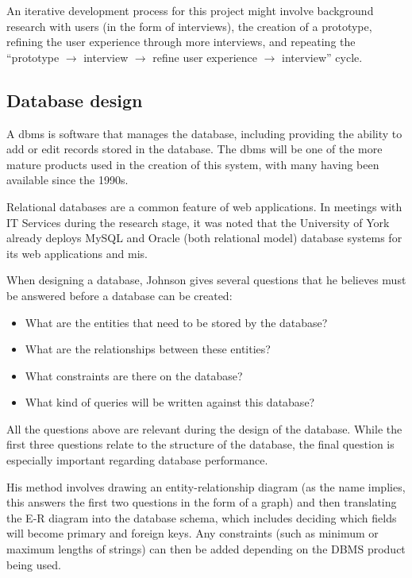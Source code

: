 \documentclass[draft]{scrartcl}
\begin{document}
An iterative development process for this project might involve background
research with users (in the form of interviews), the creation of a prototype,
refining the user experience through more interviews, and repeating the
``prototype $\rightarrow$ interview $\rightarrow$ refine user experience
$\rightarrow$ interview'' cycle.

\subsection{Database design}

A \gls{dbms} is software that manages the database, including providing the
ability to add or edit records stored in the database. The \gls{dbms} will be
one of the more mature products used in the creation of this system, with many
having been available since the 1990s.

Relational databases are a common feature of web applications. In meetings
with IT Services during the research stage, it was noted that the University
of York already deploys MySQL and Oracle (both relational model) database
systems for its web applications and \gls{mis}.

When designing a database, Johnson \cite{DatabaseModelsLanguagesDesign} gives
several questions that he believes must be answered before a database can be
created:

\begin{itemize}
  \item What are the entities that need to be stored by the database?
  \item What are the relationships between these entities?
  \item What constraints are there on the database?
  \item What kind of queries will be written against this database?
\end{itemize}

All the questions above are relevant during the design of the database. While
the first three questions relate to the structure of the database, the final
question is especially important regarding database performance.

His method involves drawing an entity-relationship diagram (as the name
implies, this answers the first two questions in the form of a graph) and then
translating the E-R diagram into the database schema, which includes deciding
which fields will become primary and foreign keys. Any constraints (such as
minimum or maximum lengths of strings) can then be added depending on the DBMS
product being used.
\end{document}
